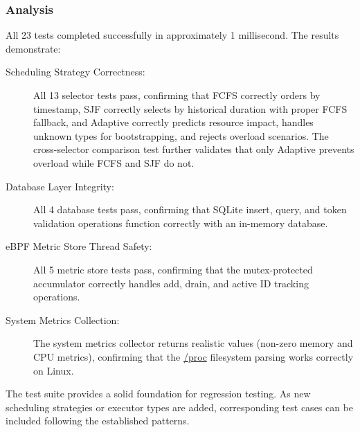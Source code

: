 \subsubsection{Analysis}

All 23 tests completed successfully in approximately 1 millisecond. The results demonstrate:

\begin{description}
	\item[Scheduling Strategy Correctness:] All 13 selector tests pass, confirming that FCFS correctly orders by timestamp, SJF correctly selects by historical duration with proper FCFS fallback, and Adaptive correctly predicts resource impact, handles unknown types for bootstrapping, and rejects overload scenarios. The cross-selector comparison test further validates that only Adaptive prevents overload while FCFS and SJF do not.

	\item[Database Layer Integrity:] All 4 database tests pass, confirming that SQLite insert, query, and token validation operations function correctly with an in-memory database.

	\item[eBPF Metric Store Thread Safety:] All 5 metric store tests pass, confirming that the mutex-protected accumulator correctly handles add, drain, and active ID tracking operations.

	\item[System Metrics Collection:] The system metrics collector returns realistic values (non-zero memory and CPU metrics), confirming that the \url{/proc} filesystem parsing works correctly on Linux.
\end{description}

The test suite provides a solid foundation for regression testing. As new scheduling strategies or executor types are added, corresponding test cases can be included following the established patterns.
